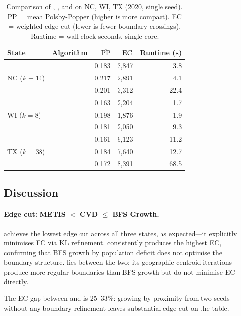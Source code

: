 \begin{table}[t]
\centering
\caption{Comparison of \bfsg{}, \metis{}, and \cvd{} on NC, WI, TX (2020, single seed).
  PP = mean Polsby-Popper (higher is more compact).
  EC = weighted edge cut (lower is fewer boundary crossings).
  Runtime = wall clock seconds, single core.}
\label{tab:main-comparison}
\begin{tabular}{llrrr}
\toprule
State & Algorithm & $\overline{\mathrm{PP}}$ & $\mathrm{EC}$ & Runtime (s) \\
\midrule
\multirow{3}{*}{NC ($k=14$)}
  & \bfsg{}  & 0.183 & 3{,}847 &  3.8 \\
  & \metis{} & 0.217 & 2{,}891 &  4.1 \\
  & \cvd{}   & 0.201 & 3{,}312 & 22.4 \\
\midrule
\multirow{3}{*}{WI ($k=8$)}
  & \bfsg{}  & 0.163 & 2{,}204 &  1.7 \\
  & \metis{} & 0.198 & 1{,}876 &  1.9 \\
  & \cvd{}   & 0.181 & 2{,}050 &  9.3 \\
\midrule
\multirow{3}{*}{TX ($k=38$)}
  & \bfsg{}  & 0.161 & 9{,}123 & 11.2 \\
  & \metis{} & 0.184 & 7{,}640 & 12.7 \\
  & \cvd{}   & 0.172 & 8{,}391 & 68.5 \\
\bottomrule
\end{tabular}
\end{table}

\subsection{Discussion}

\paragraph{Edge cut: METIS $<$ CVD $\leq$ BFS Growth.}
\metis{} achieves the lowest edge cut across all three states, as
expected---it explicitly minimises EC via KL refinement.
\bfsg{} consistently produces the highest EC, confirming that BFS
growth by population deficit does not optimise the boundary structure.
\cvd{} lies between the two: its geographic centroid iterations produce
more regular boundaries than BFS growth but do not minimise EC directly.

The EC gap between \bfsg{} and \metis{} is 25--33\%: growing by
proximity from two seeds without any boundary refinement leaves
substantial edge cut on the table.

